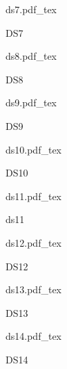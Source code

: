 \documentclass[a4paper]{article}
\newcommand{\incfig}[1]{%
    \def\svgwidth{\columnwidth}
    {#1.pdf_tex}
}
\begin{document}
\begin{figure}[ht]
    \centering
    \begin{minipage}[c][\totalheight][c]{\columnwidth}
    \incfig{ds7}
    \caption{DS7}
    \end{minipage}
    \label{fig:ds7}
\end{figure}

\begin{figure}[ht]
    \centering
    \begin{minipage}[c][\totalheight][c]{\columnwidth}
    \incfig{ds8}
    \caption{DS8}
    \end{minipage}
    \label{fig:ds8}
\end{figure}

\begin{figure}[ht]
    \centering
    \begin{minipage}[c][\totalheight][c]{0.5\columnwidth}
    \incfig{ds9}
    \caption{DS9}
    \end{minipage}
    \label{fig:ds9}
\end{figure}

\begin{figure}[ht]
    \centering
    \begin{minipage}[c][\totalheight][c]{0.5\columnwidth}
    \incfig{ds10}
    \caption{DS10}
    \end{minipage}
    \label{fig:ds10}
\end{figure}

\begin{figure}[ht]
    \centering
    \begin{minipage}[c][\totalheight][c]{0.5\columnwidth}
    \incfig{ds11}
    \caption{ds11}
    \end{minipage}
    \label{fig:ds11}
\end{figure}

\begin{figure}[ht]
    \centering
    \begin{minipage}[c][\totalheight][c]{0.9\columnwidth}
    \incfig{ds12}
    \caption{DS12}
    \end{minipage}
    \label{fig:ds12}
\end{figure}

\begin{figure}[ht]
    \centering
    \begin{minipage}[c][\totalheight][c]{0.5\columnwidth}
    \incfig{ds13}
    \caption{DS13}
    \end{minipage}
    \label{fig:ds13}
\end{figure}

\begin{figure}[ht]
    \centering
    \begin{minipage}[c][\totalheight][c]{0.5\columnwidth}
    \incfig{ds14}
    \caption{DS14}
    \end{minipage}
    \label{fig:ds14}
\end{figure}
\end{document}
